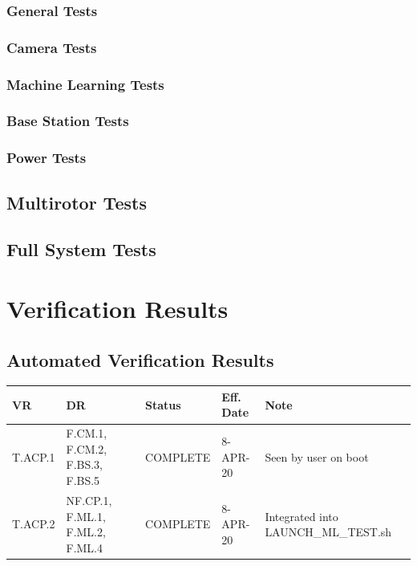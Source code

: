 \documentclass[10pt,letterpaper]{article}
\begin{document}
\subsubsection{General Tests}


\subsubsection{Camera Tests}


\subsubsection{Machine Learning Tests}


\subsubsection{Base Station Tests}


\subsubsection{Power Tests}


\subsection{Multirotor Tests}


\subsection{Full System Tests}


\section{Verification Results} \label{results}

\subsection{Automated Verification Results}
\begin{table}[H]
	\centering
	\begin{tabular}{lllll}
	\hline
	\textbf{VR} & \textbf{DR} & \textbf{Status} & \textbf{Eff. Date} & \textbf{Note}\\
	\hline
	T.ACP.1 & F.CM.1, F.CM.2, F.BS.3, F.BS.5 & COMPLETE   &8-APR-20 & Seen by user on boot\\
	T.ACP.2 & NF.CP.1, F.ML.1, F.ML.2, F.ML.4 & COMPLETE  &8-APR-20 & Integrated into LAUNCH\_ML\_TEST.sh\\
	\hline
	\end{tabular}
\end{table}
\end{document}

